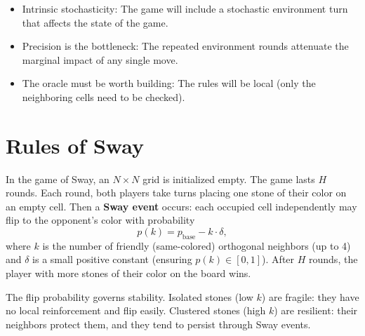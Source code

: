 \begin{itemize}
  \item Intrinsic stochasticity: The game will include a stochastic environment turn that affects the state of the game.
  \item Precision is the bottleneck: The repeated environment rounds attenuate the marginal impact of any single move.
  \item The oracle must be worth building: The rules will be local (only the neighboring cells need to be checked).
\end{itemize}

\section{Rules of Sway}

In the game of Sway, an $N \times N$ grid is initialized empty.
The game lasts $H$ rounds.
Each round, both players take turns placing one stone of their color on an empty cell.
Then a \textbf{Sway event} occurs: each occupied cell independently may flip to the opponent's color with probability
\begin{equation}
p(k) = p_{\text{base}} - k \cdot \delta,
\end{equation}
where $k$ is the number of friendly (same-colored) orthogonal neighbors (up to 4) and $\delta$ is a small positive constant (ensuring $p(k) \in [0, 1]$).
After $H$ rounds, the player with more stones of their color on the board wins.

The flip probability governs stability.
Isolated stones (low $k$) are fragile: they have no local reinforcement and flip easily.
Clustered stones (high $k$) are resilient: their neighbors protect them, and they tend to persist through Sway events.


